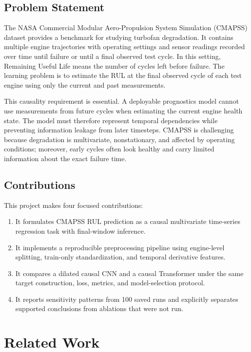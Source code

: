 \documentclass[11pt,a4paper]{article}
\begin{document}
\subsection{Problem Statement}
The NASA Commercial Modular Aero-Propulsion System Simulation (CMAPSS) dataset provides a benchmark for studying turbofan degradation. It contains multiple engine trajectories with operating settings and sensor readings recorded over time until failure or until a final observed test cycle. In this setting, Remaining Useful Life means the number of cycles left before failure. The learning problem is to estimate the RUL at the final observed cycle of each test engine using only the current and past measurements.

This causality requirement is essential. A deployable prognostics model cannot use measurements from future cycles when estimating the current engine health state. The model must therefore represent temporal dependencies while preventing information leakage from later timesteps. CMAPSS is challenging because degradation is multivariate, nonstationary, and affected by operating conditions; moreover, early cycles often look healthy and carry limited information about the exact failure time.

\subsection{Contributions}
This project makes four focused contributions:
\begin{enumerate}[leftmargin=1.5em]
    \item It formulates CMAPSS RUL prediction as a causal multivariate time-series regression task with final-window inference.
    \item It implements a reproducible preprocessing pipeline using engine-level splitting, train-only standardization, and temporal derivative features.
    \item It compares a dilated causal CNN and a causal Transformer under the same target construction, loss, metrics, and model-selection protocol.
    \item It reports sensitivity patterns from 100 saved runs and explicitly separates supported conclusions from ablations that were not run.
\end{enumerate}

\newpage

\section{Related Work}
\end{document}
